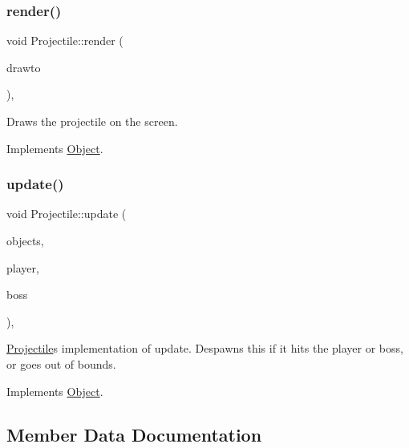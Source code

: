 \subsubsection{\texorpdfstring{render()}{render()}}
{\footnotesize\ttfamily void Projectile\+::render (\begin{DoxyParamCaption}\item[{sf\+::\+Render\+Window \&}]{drawto }\end{DoxyParamCaption})\hspace{0.3cm}{\ttfamily [override]}, {\ttfamily [virtual]}}

Draws the projectile on the screen. 

Implements \hyperlink{classObject}{Object}.

\mbox{\label{classProjectile_a4aaeec5eb44bb09058afc96d2a9b5d72}} 
\subsubsection{\texorpdfstring{update()}{update()}}
{\footnotesize\ttfamily void Projectile\+::update (\begin{DoxyParamCaption}\item[{std\+::vector$<$ \hyperlink{classObject}{Object} $\ast$$>$ \&}]{objects,  }\item[{\hyperlink{classObject}{Object} $\ast$}]{player,  }\item[{\hyperlink{classObject}{Object} $\ast$}]{boss }\end{DoxyParamCaption})\hspace{0.3cm}{\ttfamily [override]}, {\ttfamily [virtual]}}

\hyperlink{classProjectile}{Projectile}\textquotesingle{}s implementation of update. Despawns this if it hits the player or boss, or goes out of bounds. 

Implements \hyperlink{classObject}{Object}.



\subsection{Member Data Documentation}
\mbox{\label{classProjectile_a6f2bfbfa611704a2fbc031b7969d6afb}} 

